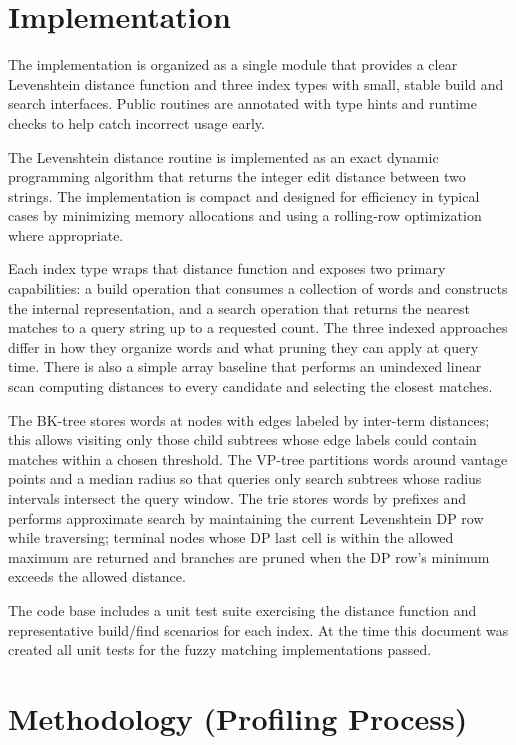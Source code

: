 \documentclass[acmsmall,screen, nonacm]{acmart}
\begin{document}
\section{Implementation}

The implementation is organized as a single module that provides a clear Levenshtein distance function and three index types with small, stable build and search interfaces. Public routines are annotated with type hints and runtime checks to help catch incorrect usage early.

The Levenshtein distance routine is implemented as an exact dynamic programming algorithm that returns the integer edit distance between two strings. The implementation is compact and designed for efficiency in typical cases by minimizing memory allocations and using a rolling-row optimization where appropriate.

Each index type wraps that distance function and exposes two primary capabilities: a build operation that consumes a collection of words and constructs the internal representation, and a search operation that returns the nearest matches to a query string up to a requested count. The three indexed approaches differ in how they organize words and what pruning they can apply at query time. There is also a simple array baseline that performs an unindexed linear scan computing distances to every candidate and selecting the closest matches.

The BK-tree stores words at nodes with edges labeled by inter-term distances; this allows visiting only those child subtrees whose edge labels could contain matches within a chosen threshold. The VP-tree partitions words around vantage points and a median radius so that queries only search subtrees whose radius intervals intersect the query window. The trie stores words by prefixes and performs approximate search by maintaining the current Levenshtein DP row while traversing; terminal nodes whose DP last cell is within the allowed maximum are returned and branches are pruned when the DP row's minimum exceeds the allowed distance.

The code base includes a unit test suite exercising the distance function and representative build/find scenarios for each index. At the time this document was created all unit tests for the fuzzy matching implementations passed.

\section{Methodology (Profiling Process)}
\end{document}
